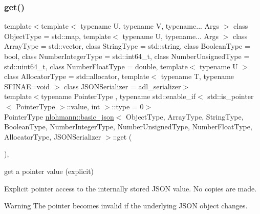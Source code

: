 \subsubsection{\texorpdfstring{get()}{get()}\hspace{0.1cm}{\footnotesize\ttfamily [4/5]}}
{\footnotesize\ttfamily template$<$template$<$ typename U, typename V, typename... Args $>$ class Object\+Type = std\+::map, template$<$ typename U, typename... Args $>$ class Array\+Type = std\+::vector, class String\+Type  = std\+::string, class Boolean\+Type  = bool, class Number\+Integer\+Type  = std\+::int64\+\_\+t, class Number\+Unsigned\+Type  = std\+::uint64\+\_\+t, class Number\+Float\+Type  = double, template$<$ typename U $>$ class Allocator\+Type = std\+::allocator, template$<$ typename T, typename S\+F\+I\+N\+A\+E=void $>$ class J\+S\+O\+N\+Serializer = adl\+\_\+serializer$>$ \\
template$<$typename Pointer\+Type , typename std\+::enable\+\_\+if$<$ std\+::is\+\_\+pointer$<$ Pointer\+Type $>$\+::value, int $>$\+::type  = 0$>$ \\
Pointer\+Type \mbox{\hyperlink{classnlohmann_1_1basic__json}{nlohmann\+::basic\+\_\+json}}$<$ Object\+Type, Array\+Type, String\+Type, Boolean\+Type, Number\+Integer\+Type, Number\+Unsigned\+Type, Number\+Float\+Type, Allocator\+Type, J\+S\+O\+N\+Serializer $>$\+::get (\begin{DoxyParamCaption}{ }\end{DoxyParamCaption})\hspace{0.3cm}{\ttfamily [inline]}, {\ttfamily [noexcept]}}



get a pointer value (explicit) 

Explicit pointer access to the internally stored J\+S\+ON value. No copies are made.

\begin{DoxyWarning}{Warning}
The pointer becomes invalid if the underlying J\+S\+ON object changes.
\end{DoxyWarning}


